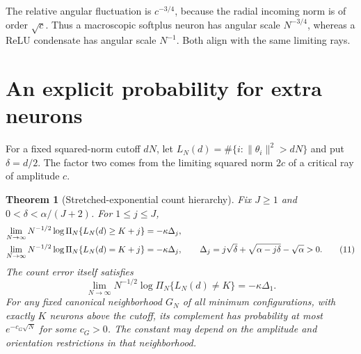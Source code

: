 \documentclass[11pt]{article}
\newtheorem{theorem}{Theorem}\newtheorem{lemma}[theorem]{Lemma}
\begin{document}
The relative angular fluctuation is $c^{-3/4}$, because the radial
incoming norm is of order $\sqrt c$. Thus a macroscopic softplus neuron
has angular scale $N^{-3/4}$, whereas a ReLU condensate has angular scale
$N^{-1}$. Both align with the same limiting rays.

\section{An explicit probability for extra neurons}
For a fixed squared-norm cutoff $dN$, let
$L_N(d)=\#\{i:\|\theta_i\|^2>dN\}$ and put $\delta=d/2$.
The factor two comes from the limiting squared norm $2c$ of a critical
ray of amplitude $c$.

\begin{theorem}[Stretched-exponential count hierarchy]\label{thm:count}
Fix $J\ge1$ and $0<\delta<\alpha/(J+2)$. For $1\le j\le J$,
\begin{align}
 \lim_{N\to\infty}N^{-1/2}\log\Pi_N\{L_N(d)\ge K+j\}
 &=-\kappa\Delta_j,\notag\\
 \lim_{N\to\infty}N^{-1/2}\log\Pi_N\{L_N(d)=K+j\}
 &=-\kappa\Delta_j,\qquad
 \Delta_j=j\sqrt\delta+\sqrt{\alpha-j\delta}-\sqrt\alpha>0.
 \tag{11}
\end{align}
The count error itself satisfies
\[
       \lim_{N\to\infty}N^{-1/2}\log\Pi_N\{L_N(d)\ne K\}
                                      =-\kappa\Delta_1. \tag{12}
\]
For any fixed canonical neighborhood $G_N$ of all minimum configurations,
with exactly $K$ neurons above the cutoff, its complement has probability
at most $e^{-c_G\sqrt N}$ for some $c_G>0$. The constant may depend on
the amplitude and orientation restrictions in that neighborhood.
\end{theorem}
\end{document}
